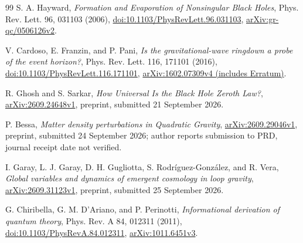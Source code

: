 \documentclass[11pt,a4paper]{article}
\begin{document}
\begin{thebibliography}{99}
S. A. Hayward,
\textit{Formation and Evaporation of Nonsingular Black Holes},
Phys. Rev. Lett. 96, 031103 (2006),
\href{https://doi.org/10.1103/PhysRevLett.96.031103}{doi:10.1103/PhysRevLett.96.031103},
\href{https://arxiv.org/abs/gr-qc/0506126v2}{arXiv:gr-qc/0506126v2}.

V. Cardoso, E. Franzin, and P. Pani,
\textit{Is the gravitational-wave ringdown a probe of the event horizon?},
Phys. Rev. Lett. 116, 171101 (2016),
\href{https://doi.org/10.1103/PhysRevLett.116.171101}{doi:10.1103/PhysRevLett.116.171101},
\href{https://arxiv.org/abs/1602.07309v4}{arXiv:1602.07309v4 (includes Erratum)}.

R. Ghosh and S. Sarkar,
\textit{How Universal Is the Black Hole Zeroth Law?},
\href{https://arxiv.org/abs/2609.24648v1}{arXiv:2609.24648v1},
preprint, submitted 21 September 2026.

P. Bessa,
\textit{Matter density perturbations in Quadratic Gravity},
\href{https://arxiv.org/abs/2609.29046v1}{arXiv:2609.29046v1},
preprint, submitted 24 September 2026; author reports submission to PRD,
journal receipt date not verified.

I. Garay, L. J. Garay, D. H. Gugliotta, S. Rodr\'iguez-Gonz\'alez, and R. Vera,
\textit{Global variables and dynamics of emergent cosmology in loop gravity},
\href{https://arxiv.org/abs/2609.31123v1}{arXiv:2609.31123v1},
preprint, submitted 25 September 2026.

G. Chiribella, G. M. D'Ariano, and P. Perinotti,
\textit{Informational derivation of quantum theory},
Phys. Rev. A 84, 012311 (2011),
\href{https://doi.org/10.1103/PhysRevA.84.012311}{doi:10.1103/PhysRevA.84.012311},
\href{https://arxiv.org/abs/1011.6451v3}{arXiv:1011.6451v3}.

\end{thebibliography}
\end{document}
